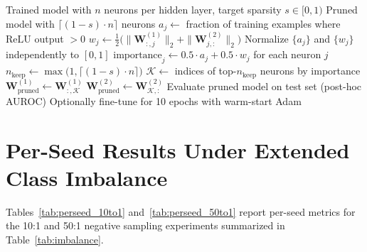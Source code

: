 \documentclass[journal]{IEEEtran}
\begin{document}
\begin{algorithm}[!t]
\caption{Structured Neuron Pruning}
\label{alg:pruning}
\begin{algorithmic}[1]
\REQUIRE Trained model with $n$ neurons per hidden layer, target sparsity $s \in [0, 1)$
\ENSURE Pruned model with $\lceil (1-s) \cdot n \rceil$ neurons
\STATE {}
  \STATE $a_j \leftarrow$ fraction of training examples where $\text{ReLU}$ output $> 0$ 
  \STATE $w_j \leftarrow \frac{1}{2}\bigl(\|\mathbf{W}^{(1)}_{:,j}\|_2 + \|\mathbf{W}^{(2)}_{j,:}\|_2\bigr)$ 
\ENDFOR
\STATE Normalize $\{a_j\}$ and $\{w_j\}$ independently to $[0, 1]$
\STATE $\text{importance}_j \leftarrow 0.5 \cdot a_j + 0.5 \cdot w_j$ for each neuron $j$
\STATE {}
\STATE $n_{\text{keep}} \leftarrow \max\bigl(1, \lceil (1 - s) \cdot n \rceil\bigr)$
\STATE $\mathcal{K} \leftarrow$ indices of top-$n_{\text{keep}}$ neurons by importance
\STATE $\mathbf{W}^{(1)}_{\text{pruned}} \leftarrow \mathbf{W}^{(1)}_{:, \mathcal{K}}$ 
\STATE $\mathbf{W}^{(2)}_{\text{pruned}} \leftarrow \mathbf{W}^{(2)}_{\mathcal{K}, :}$ 
\STATE {}
\STATE Evaluate pruned model on test set (post-hoc AUROC)
\STATE Optionally fine-tune for 10 epochs with warm-start Adam
\end{algorithmic}
\end{algorithm}

\section{Per-Seed Results Under Extended Class Imbalance}
\label{app:imbalance_seeds}

Tables~\ref{tab:perseed_10to1} and~\ref{tab:perseed_50to1} report per-seed
metrics for the 10:1 and 50:1 negative sampling experiments summarized in
Table~\ref{tab:imbalance}.
\end{document}
